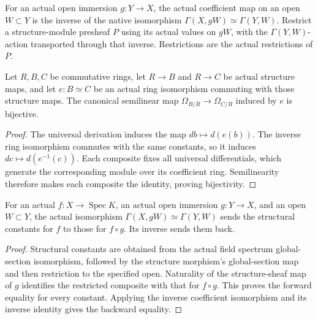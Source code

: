 \begin{definition}
\label{sc0-canonical-port:geom:open-immersion-module-presheaf-restriction}
\leanok
For an actual open immersion \(g:Y\to X\), the
actual coefficient map on an open \(W\subset Y\)
is the inverse of the native isomorphism
\(\Gamma(X,gW)\simeq\Gamma(Y,W)\).
Restrict a structure-module presheaf \(P\) using its
actual values on \(gW\), with the \(\Gamma(Y,W)\)-action
transported through that inverse. Restrictions are the
actual restrictions of \(P\).
\end{definition}

\begin{lemma}
\label{sc0-canonical-port:geom:kaehler-coefficient-isomorphism-bijective}
\leanok
Let \(R,B,C\) be commutative rings, let \(R\to B\)
and \(R\to C\) be actual structure maps, and let
\(e:B\simeq C\) be an actual ring isomorphism commuting
with those structure maps. The canonical semilinear map
\(\Omega_{B/R}\to\Omega_{C/R}\) induced by \(e\)
is bijective.
\end{lemma}
\begin{proof}
The universal derivation induces the map \(db\mapsto d(e(b))\).
The inverse ring isomorphism commutes with the same constants,
so it induces \(dc\mapsto d(e^{-1}(c))\). Each composite
fixes all universal differentials, which generate the
corresponding module over its coefficient ring. Semilinearity
therefore makes each composite the identity, proving bijectivity.
\end{proof}

\begin{lemma}
\label{sc0-canonical-port:geom:open-immersion-constant-squares}
\leanok
For an actual \(f:X\to\operatorname{Spec}K\), an actual
open immersion \(g:Y\to X\), and an open \(W\subset Y\),
the actual isomorphism \(\Gamma(X,gW)\simeq\Gamma(Y,W)\)
sends the structural constants for \(f\) to those for
\(f\circ g\). Its inverse sends them back.
\end{lemma}
\begin{proof}
Structural constants are obtained from the actual field
spectrum global-section isomorphism, followed by the structure
morphism's global-section map and then restriction to the
specified open. Naturality of the structure-sheaf map of \(g\)
identifies the restricted composite with that for \(f\circ g\).
This proves the forward equality for every constant. Applying
the inverse coefficient isomorphism and its inverse identity
gives the backward equality.
\end{proof}

